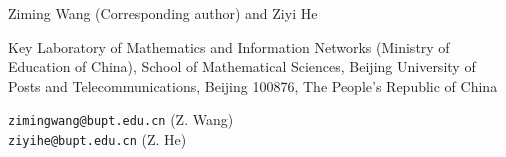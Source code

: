 \documentclass[11pt, twoside]{article}
\numberwithin{equation}{section}
\theoremstyle{definition}
\begin{document}
\bigskip \bigskip

\noindent Ziming Wang (Corresponding author) and Ziyi He

\medskip

\noindent Key Laboratory of Mathematics and Information Networks 
(Ministry of Education of China), School of Mathematical Sciences, 
Beijing University of Posts and Telecommunications, Beijing 100876, 
The People's Republic of China

\smallskip

 \texttt{zimingwang@bupt.edu.cn} (Z. Wang)\\
\noindent{} \texttt{ziyihe@bupt.edu.cn} (Z. He)
\end{document}
